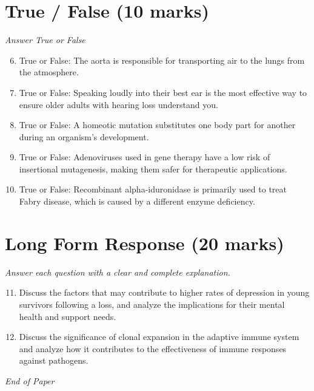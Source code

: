 \documentclass[12pt]{article}
\begin{document}
\section*{True / False (10 marks)}
\textit{Answer True or False}
\begin{enumerate}[label=\arabic*.]
\setcounter{enumi}{5}
\item True or False: The aorta is responsible for transporting air to the lungs from the atmosphere.
\item True or False: Speaking loudly into their best ear is the most effective way to ensure older adults with hearing loss understand you.
\item True or False: A homeotic mutation substitutes one body part for another during an organism's development.
\item True or False: Adenoviruses used in gene therapy have a low risk of insertional mutagenesis, making them safer for therapeutic applications.
\item True or False: Recombinant alpha-iduronidase is primarily used to treat Fabry disease, which is caused by a different enzyme deficiency.
\end{enumerate}

\section*{Long Form Response (20 marks)}
\textit{Answer each question with a clear and complete explanation.}
\begin{enumerate}[label=\arabic*.]
\setcounter{enumi}{10}
\item Discuss the factors that may contribute to higher rates of depression in young survivors following a loss, and analyze the implications for their mental health and support needs.
\item Discuss the significance of clonal expansion in the adaptive immune system and analyze how it contributes to the effectiveness of immune responses against pathogens.
\end{enumerate}

\vfill
\noindent\textit{End of Paper}
\end{document}
